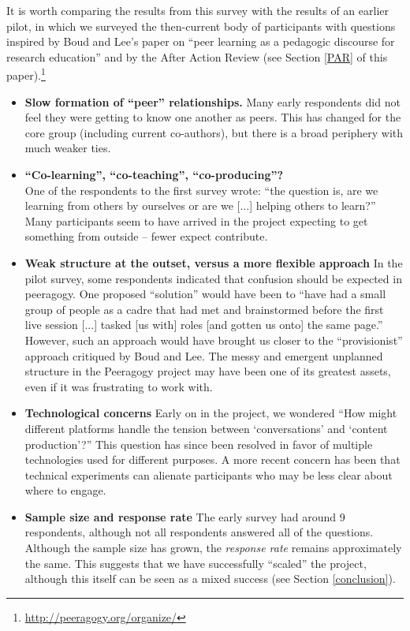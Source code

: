 \documentclass{acm_proc_article-sp}
\begin{document}
It is worth comparing the results from this survey with the results of an earlier pilot, in which we surveyed the then-current body of participants with questions inspired by Boud and Lee's paper on ``peer learning as a pedagogic discourse for research education'' \cite{boud2005peer} and by the After Action Review (see Section \ref{PAR} of this paper).\footnote{\url{http://peeragogy.org/organize/}}
\begin{itemize}
\item {\bf Slow formation of ``peer'' relationships.}  Many early respondents did not feel they were getting to know one another as peers.  This has changed for the core group (including current co-authors), but there is a broad periphery with much weaker ties.
\item {\bf ``Co-learning'', ``co-teaching'', ``co-producing''?} \\ One of the respondents to the first survey wrote: ``the question is, are we learning from others by ourselves or are we [...] helping others to learn?''   Many participants seem to have arrived in the project expecting to get something from outside -- fewer expect contribute. 
\item {\bf Weak structure at the outset, versus a more flexible approach}  In the pilot survey, some respondents indicated that confusion should be expected in peeragogy.  One proposed ``solution'' would have been to ``have had a small group of people as a cadre that had met and brainstormed before the first live session [...] tasked [us with] roles [and gotten us onto] the same page.''  However, such an approach would have brought us closer to the ``provisionist'' approach critiqued by Boud and Lee.  The messy and emergent unplanned structure in the Peeragogy project may have been one of its greatest assets, even if it was frustrating to work with.
\item {\bf Technological concerns}  Early on in the project, we wondered ``How might different platforms handle the tension between `conversations' and `content production'?''  This question has since been resolved in favor of multiple technologies used for different purposes.  A more recent concern has been that technical experiments can alienate participants who may be less clear about where to engage. 
\item {\bf Sample size and response rate}  The early survey had around 9 respondents, although not all respondents answered all of the questions.  Although the sample size has grown, the \emph{response rate} remains approximately the same.  This suggests that we have successfully ``scaled'' the project, although this itself can be seen as a mixed success (see Section \ref{conclusion}).
\end{itemize}
\end{document}
